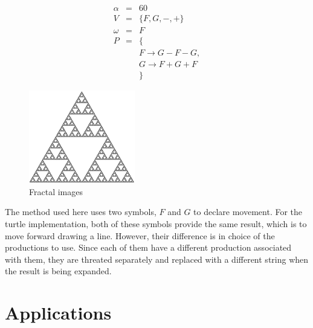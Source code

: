 \documentclass{acmtog}
\begin{document}
\begin{eqnarray*}
  \alpha  &=& 60                        \\
  V       &=& \{F, G, -, +\}            \\
  \omega  &=& F                         \\
  P       &=& \{                        \\
          & & F \rightarrow G-F-G,      \\
          & & G \rightarrow F+G+F       \\
          & & \}                        
\end{eqnarray*}

\begin{figure}[!htp]
  \begin{center}
    \includegraphics[width=0.8\columnwidth]{images/6_sierpinski}
    \caption{Fractal images \label{fig:Sierpinski Triangle}}
    \end{center}
\end{figure}

The method used here uses two symbols, $F$ and $G$ to declare movement. For the turtle implementation, both of these symbols provide the same result, which is to move forward drawing a line. However, their difference is in choice of the productions to use. Since each of them have a different production associated with them, they are threated separately and replaced with a different string when the result is being expanded.

\section{Applications}
\label{sec:applications}
\end{document}
